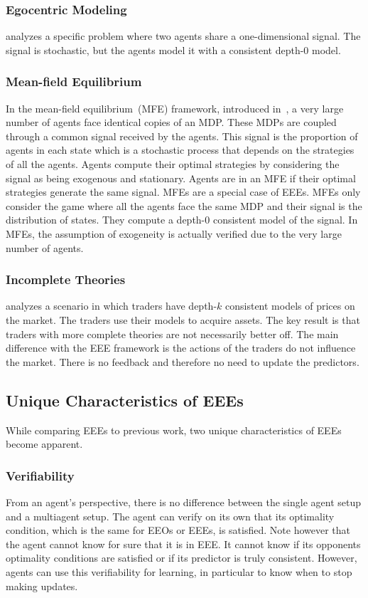\subsubsection{Egocentric Modeling}
\cite{seah_shamma:2008} analyzes a specific problem where two agents share a one-dimensional signal.
The signal is stochastic, but the agents model it with a consistent depth-\(0\) model.

\subsubsection{Mean-field Equilibrium}
In the mean-field equilibrium~(MFE) framework, introduced in~\cite{lasry_lions:2007}, a very large number of agents face identical copies of an MDP.
These MDPs are coupled through a common signal received by the agents.
This signal is the proportion of agents in each state which is a stochastic process that depends on the strategies of all the agents.
Agents compute their optimal strategies by considering the signal as being exogenous and stationary.
Agents are in an MFE if their optimal strategies generate the same signal.
MFEs are a special case of EEEs.
MFEs only consider the game where all the agents face the same MDP and their signal is the distribution of states.
They compute a depth-\(0\) consistent model of the signal.
In MFEs, the assumption of exogeneity is actually verified due to the very large number of agents.

\subsubsection{Incomplete Theories}
\cite{eyster_piccione:2011} analyzes a scenario in which traders have depth-\(k\) consistent models of prices on the market.
The traders use their models to acquire assets.
The key result is that traders with more complete theories are not necessarily better off.
The main difference with the EEE framework is the actions of the traders do not influence the market.
There is no feedback and therefore no need to update the predictors.

\subsection{Unique Characteristics of EEEs}

While comparing EEEs to previous work, two unique characteristics of EEEs become apparent.

\subsubsection{Verifiability}
From an agent's perspective, there is no difference between the single agent setup and a multiagent setup.
The agent can verify on its own that its optimality condition, which is the same for EEOs or EEEs, is satisfied.
Note however that the agent cannot know for sure that it is in EEE.
It cannot know if its opponents optimality conditions are satisfied or if its predictor is truly consistent.
However, agents can use this verifiability for learning, in particular to know when to stop making updates.

